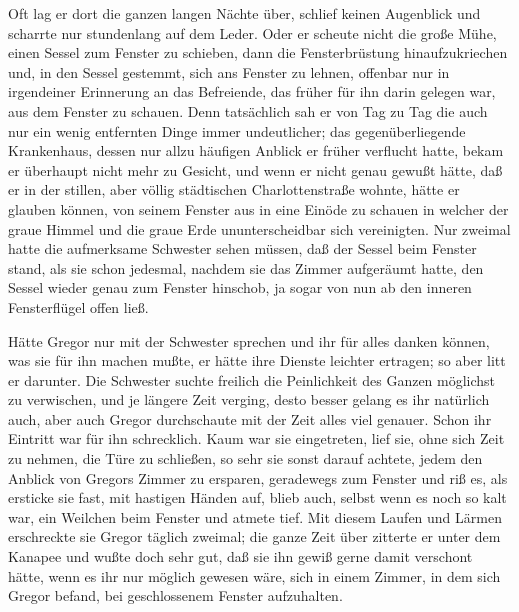 Oft lag er dort die ganzen langen Nächte über, schlief keinen Augenblick
und scharrte nur stundenlang auf dem Leder. Oder er scheute nicht die
große Mühe, einen Sessel zum Fenster zu schieben, dann die
Fensterbrüstung hinaufzukriechen und, in den Sessel gestemmt, sich ans
Fenster zu lehnen, offenbar nur in irgendeiner Erinnerung an das
Befreiende, das früher für ihn darin gelegen war, aus dem Fenster zu
schauen. Denn tatsächlich sah er von Tag zu Tag die auch nur ein wenig
entfernten Dinge immer undeutlicher; das gegenüberliegende Krankenhaus,
dessen nur allzu häufigen Anblick er früher verflucht hatte, bekam er
überhaupt nicht mehr zu Gesicht, und wenn er nicht genau gewußt hätte,
daß er in der stillen, aber völlig städtischen Charlottenstraße wohnte,
hätte er glauben können, von seinem Fenster aus in eine Einöde zu
schauen in welcher der graue Himmel und die graue Erde ununterscheidbar
sich vereinigten. Nur zweimal hatte die aufmerksame Schwester sehen
müssen, daß der Sessel beim Fenster stand, als sie schon jedesmal,
nachdem sie das Zimmer aufgeräumt hatte, den Sessel wieder genau zum
Fenster hinschob, ja sogar von nun ab den inneren Fensterflügel offen
ließ.

Hätte Gregor nur mit der Schwester sprechen und ihr für alles danken
können, was sie für ihn machen mußte, er hätte ihre Dienste leichter
ertragen; so aber litt er darunter. Die Schwester suchte freilich die
Peinlichkeit des Ganzen möglichst zu verwischen, und je längere Zeit
verging, desto besser gelang es ihr natürlich auch, aber auch Gregor
durchschaute mit der Zeit alles viel genauer. Schon ihr Eintritt war für
ihn schrecklich. Kaum war sie eingetreten, lief sie, ohne sich Zeit zu
nehmen, die Türe zu schließen, so sehr sie sonst darauf achtete, jedem
den Anblick von Gregors Zimmer zu ersparen, geradewegs zum Fenster und
riß es, als ersticke sie fast, mit hastigen Händen auf, blieb auch,
selbst wenn es noch so kalt war, ein Weilchen beim Fenster und atmete
tief. Mit diesem Laufen und Lärmen erschreckte sie Gregor täglich
zweimal; die ganze Zeit über zitterte er unter dem Kanapee und wußte
doch sehr gut, daß sie ihn gewiß gerne damit verschont hätte, wenn es
ihr nur möglich gewesen wäre, sich in einem Zimmer, in dem sich Gregor
befand, bei geschlossenem Fenster aufzuhalten.

